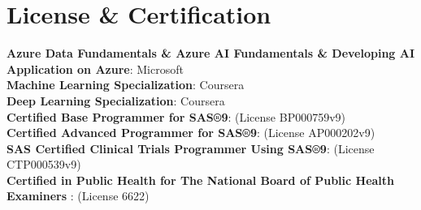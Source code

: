 \documentclass[letterpaper,11pt]{article}
\begin{document}
\section{License \& Certification}
\begin{itemize}[leftmargin=0.15in, label={}]
    \normalsize{\item{
     \textbf{Azure Data Fundamentals \& Azure AI Fundamentals \& Developing AI Application on Azure}{: {Microsoft} } \\
     \textbf{Machine Learning Specialization}{: {Coursera} } \\
     \textbf{Deep Learning Specialization}{: {Coursera} } \\
     \textbf{Certified Base Programmer for SAS®9}{: {(License BP000759v9)} } \\
     \textbf{Certified Advanced Programmer for SAS®9}{: {(License AP000202v9)} } \\
     \textbf{SAS Certified Clinical Trials Programmer Using SAS®9}{: {(License CTP000539v9)} } \\
     \textbf{Certified in Public Health for The National Board of Public Health Examiners }{: {(License 6622)} } \\
    }}    
 \end{itemize}

\end{document}
